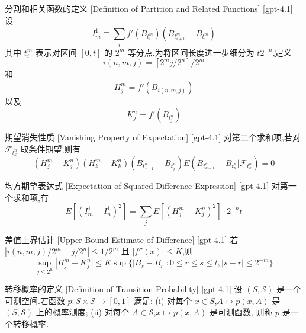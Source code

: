 \documentclass[UTF8]{ctexart}
\begin{document}
    
    
    \begin{dfn}
        {分割和相关函数的定义}
        [Definition of Partition and Related Functions]
        [gpt-4.1]
        设
\[
I_{m}^{1} \equiv \sum_{i} f'(B_{t_{i}^{m}}) (B_{t_{i+1}^{m}} - B_{t_{i}^{m}})
\]
其中 $t_{i}^{m}$ 表示对区间 $[0, t]$ 的 $2^m$ 等分点.为将区间长度进一步细分为 $t 2^{-n}$,定义
\[
i(n, m, j) = [2^{m} j / 2^{n}] / 2^{m}
\]
和
\[
H_{j}^{m} = f'(B_{i(n, m, j)})
\]
以及
\[
K_{j}^{n} = f'(B_{t_{j}^{n}})
\]

    \end{dfn}
    
    
    
    \begin{ppt}
        {期望消失性质}
        [Vanishing Property of Expectation]
        [gpt-4.1]
        对第二个求和项,若对 $\mathcal{F}_{t_{k}^{n}}$ 取条件期望,则有
\[
(H_{j}^{m} - K_{j}^{n}) (H_{k}^{m} - K_{k}^{n}) (B_{t_{j+1}^{n}} - B_{t_{j}^{n}}) E(B_{t_{k+1}^{n}} - B_{t_{k}^{n}} | \mathcal{F}_{t_{k}^{n}}) = 0
\]

    \end{ppt}
    
    
    
    \begin{ppt}
        {均方期望表达式}
        [Expectation of Squared Difference Expression]
        [gpt-4.1]
        对第一个求和项,有
\[
E[(I_{m}^{1} - I_{n}^{1})^{2}] = \sum_{j} E[(H_{j}^{m} - K_{j}^{n})^{2}] \cdot 2^{-n} t
\]

    \end{ppt}
    
    
    
    \begin{ppt}
        {差值上界估计}
        [Upper Bound Estimate of Difference]
        [gpt-4.1]
        若 $|i(n, m, j) / 2^{m} - j / 2^{n}| \leq 1 / 2^{m}$ 且 $|f''(x)| \le K$,则
\[
\sup_{j \leq 2^{n}} |H_{j}^{m} - K_{j}^{n}| \leq K \sup \{ |B_{s} - B_{r}| : 0 \leq r \leq s \leq t , |s - r| \leq 2^{-m} \}
\]

    \end{ppt}
    
    
    
    \begin{dfn}
        {转移概率的定义}
        [Definition of Transition Probability]
        [gpt-4.1]
        设 $(S, \mathcal{S})$ 是一个可测空间.若函数 $p : S \times \mathcal{S} \to [0,1]$ 满足:
(i) 对每个 $x \in S$,$A \mapsto p(x, A)$ 是 $(S, \mathcal{S})$ 上的概率测度;
(ii) 对每个 $A \in \mathcal{S}$,$x \mapsto p(x, A)$ 是可测函数,
则称 $p$ 是一个转移概率.
    \end{dfn}
    
\end{document}
